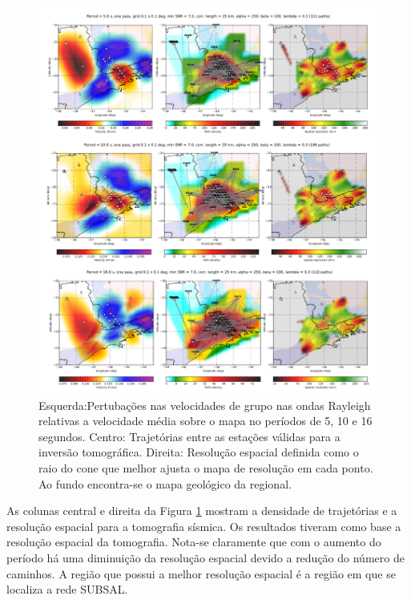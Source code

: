 \begin{figure}[!ht]
\centering
\includegraphics[scale=0.45]{Figs/mapa_tomografia.png}
\caption{Esquerda:Pertubações nas velocidades de grupo nas ondas Rayleigh relativas a velocidade média sobre o mapa no períodos de 5, 10 e 16 segundos. Centro: Trajetórias entre as estações válidas para a inversão tomográfica. Direita: Resolução espacial definida como o raio do cone que melhor ajusta o mapa de resolução em cada ponto. Ao fundo encontra-se o mapa geológico da regional.}
\label{tomografia}
\end{figure}

As colunas central e direita da Figura \ref{tomografia} mostram a densidade de trajetórias e a resolução espacial para a tomografia sísmica. Os resultados tiveram como base a resolução espacial da tomografia. Nota-se claramente que com o aumento do período há uma diminuição da resolução espacial devido a redução do número de caminhos. A região que possui a melhor resolução espacial é a região em que se localiza a rede SUBSAL.

\pagebreak
